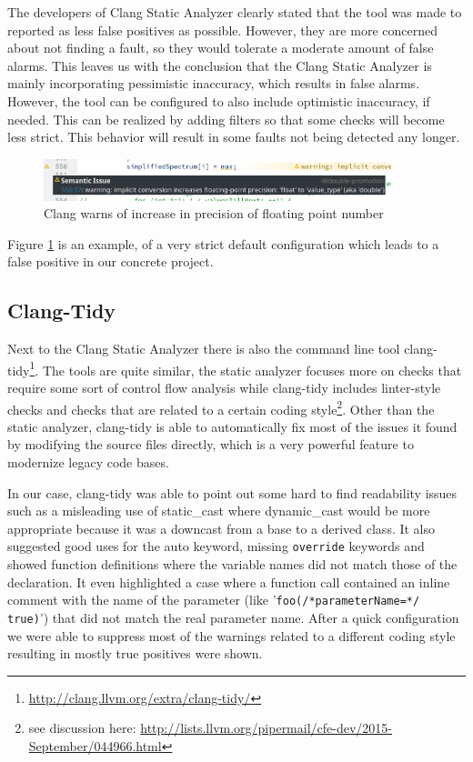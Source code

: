 \documentclass{scrreprt}
\begin{document}
The developers of Clang Static Analyzer clearly stated that the tool was made to reported as less false positives as possible. However, they are more concerned about not finding a fault, so they would tolerate a moderate amount of false alarms. This leaves us with the conclusion that the Clang Static Analyzer is mainly incorporating pessimistic inaccuracy, which results in false alarms. However, the tool can be configured to also include optimistic inaccuracy, if needed. This can be realized by adding filters so that some checks will become less strict. This behavior will result in some faults not being detected any longer.

\begin{figure}[H]
	\centering
	\includegraphics[width=0.9\textwidth]{img/clang_fp_implicit_precision_increase}
	\caption[Clang warns of increase in precision]{Clang warns of increase in precision of floating point number}
	\label{fig:clang_fp_implicit_precision_increase}
\end{figure}

Figure \ref{fig:clang_fp_implicit_precision_increase} is an example, of a very strict default configuration which leads to a false positive in our concrete project.

\subsection{Clang-Tidy} 

Next to the Clang Static Analyzer there is also the command line tool clang-tidy\footnote{\url{http://clang.llvm.org/extra/clang-tidy/}}. The tools are quite similar, the static analyzer focuses more on checks that require some sort of control flow analysis while clang-tidy includes linter-style checks and checks that are related to a certain coding style\footnote{see discussion here: \url{http://lists.llvm.org/pipermail/cfe-dev/2015-September/044966.html}}. Other than the static analyzer, clang-tidy is able to automatically fix most of the issues it found by modifying the source files directly, which is a very powerful feature to modernize legacy code bases.

In our case, clang-tidy was able to point out some hard to find readability issues such as a misleading use of static\_cast where dynamic\_cast would be more appropriate because it was a downcast from a base to a derived class. It also suggested good uses for the auto keyword, missing \texttt{override} keywords and showed function definitions where the variable names did not match those of the declaration. It even highlighted a case where a function call contained an inline comment with the name of the parameter (like '\texttt{foo(/*parameterName=*/ true)}') that did not match the real parameter name. After a quick configuration we were able to suppress most of the warnings related to a different coding style resulting in mostly true positives were shown.
\end{document}
